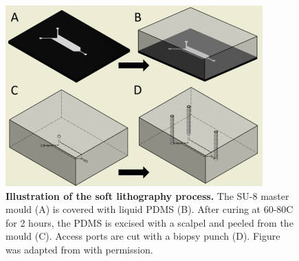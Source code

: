         \begin{figure}[h]
            \centering
            \includegraphics[scale=0.7]{chapter2/figures/softLithography/softLithographyProcess.jpg}
            \caption[Illustration of the soft lithography process]{\textbf{Illustration of the soft lithography process.} The SU-8 master mould (A) is covered with liquid PDMS (B). After curing at 60-80\degree C for 2 hours, the PDMS is excised with a scalpel and peeled from the mould (C). Access ports are cut with a biopsy punch (D). Figure was adapted from \cite{johnstoneThesis} with permission.}
            \label{fig:methods:softLithography}
        \end{figure}
        \label{sec:methods:softLitho}
